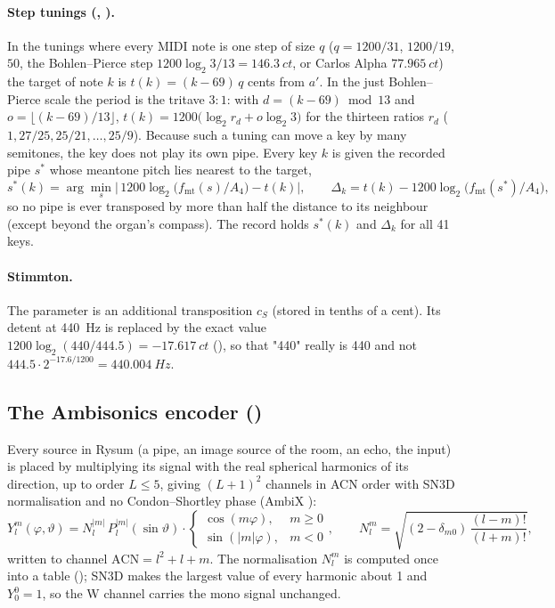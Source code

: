 \paragraph{Step tunings (, ).} In the tunings where every MIDI note is one
step of size $q$ ($q = 1200/31$, $1200/19$, $50$, the Bohlen--Pierce step $1200\log_2 3/13 = \SI{146.3}{ct}$, or Carlos
Alpha $\SI{77.965}{ct}$) the target of note $k$ is $t(k) = (k-69)\,q$ cents from $a'$. In the just Bohlen--Pierce scale
the period is the tritave $3{:}1$: with $d = (k-69) \bmod 13$ and $o = \lfloor (k-69)/13\rfloor$,
$t(k) = 1200\bigl(\log_2 r_d + o\log_2 3\bigr)$ for the thirteen ratios $r_d$ ($1, 27/25, 25/21, \dots, 25/9$).
Because such a tuning can move a key by many semitones, the key does not play its own pipe. Every key $k$ is given
the recorded pipe $s^*$ whose meantone pitch lies nearest to the target,
\begin{equation}
  s^*(k) = \arg\min_s \bigl|\,1200\log_2\!\bigl(f_\mathrm{mt}(s)/A_4\bigr) - t(k)\bigr|,\qquad
  \Delta_k = t(k) - 1200\log_2\!\bigl(f_\mathrm{mt}(s^*)/A_4\bigr),
\end{equation}
so no pipe is ever transposed by more than half the distance to its neighbour (except beyond the organ's compass).
The  record holds $s^*(k)$ and $\Delta_k$ for all 41 keys.

\paragraph{Stimmton.} The  parameter is an additional transposition $c_S$ (stored in tenths of a cent).
Its detent at \SI{440}{Hz} is replaced by the exact value $1200\log_2(440/444.5) = \SI{-17.617}{ct}$
(), so that "440" really is 440 and not $444.5\cdot 2^{-17.6/1200} = \SI{440.004}{Hz}$.

\subsection{The Ambisonics encoder ()}
\label{sec:math-encoder}
Every source in Rysum (a pipe, an image source of the room, an echo, the input) is placed by multiplying its
signal with the real spherical harmonics of its direction, up to order $L\le 5$, giving $(L+1)^2$ channels in ACN
order with SN3D normalisation and no Condon--Shortley phase (AmbiX \citep{nachbar2011ambix}):
\begin{equation}
  Y_l^m(\varphi,\vartheta) = N_l^{|m|}\,P_l^{|m|}(\sin\vartheta)\cdot
  \begin{cases}\cos(m\varphi), & m\ge 0\\ \sin(|m|\varphi), & m<0\end{cases},\qquad
  N_l^m = \sqrt{(2-\delta_{m0})\,\frac{(l-m)!}{(l+m)!}},
\end{equation}
written to channel $\mathrm{ACN} = l^2+l+m$. The normalisation $N_l^m$ is computed once into a table
(); SN3D makes the largest value of every harmonic about 1 and $Y_0^0 = 1$, so the W channel carries
the mono signal unchanged.

